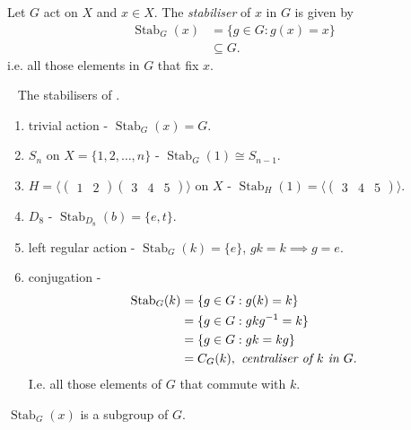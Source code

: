 \begin{definition}[Stabiliser] \label{def:19}
    Let $G$ act on $X$ and $x \in X$.
    The \emph{stabiliser} of $x$ in $G$ is given by
    \begin{align*}
        \operatorname{Stab}_G(x) &= \{ g \in G : g(x) = x \} \\
        &\subseteq G.
    \end{align*} 
    i.e. all those elements in $G$ that fix $x$.
\end{definition} 

\begin{example} ~
    The stabilisers of .
    \begin{enumerate}
        \item trivial action - $\operatorname{Stab}_G(x) = G$.
        \item $S_n$ on $X = \{1, 2, \dots, n\}$ - $\operatorname{Stab}_G(1) \cong S_{n-1}$.
        \item $H = \langle \begin{pmatrix}1 & 2\end{pmatrix} \begin{pmatrix}3 & 4 & 5\end{pmatrix} \rangle$ on $X$ - $\operatorname{Stab}_H(1) = \langle \begin{pmatrix}3 & 4 & 5\end{pmatrix} \rangle$.
        \item $D_8$ - $\operatorname{Stab}_{D_8}(b) = \{e, t\}$. \\
        \item left regular action - $\operatorname{Stab}_G(k) = \{e\}$, $gk = k \implies g = e$.
        \item conjugation - \begin{align*}
            \operatorname{Stab}_G(k) &= \{g \in G : g(k) = k\} \\
            &= \{g \in G : g k g^{-1} = k\} \\
            &= \{g \in G : g k = kg \} \\
            &= C_G(k), \emph{ centraliser of $k$ in $G$}.
        \end{align*} I.e. all those elements of $G$ that commute with $k$.
    \end{enumerate} 
\end{example} 

\begin{lemma} \label{lem:18}
    $\operatorname{Stab}_G(x)$ is a subgroup of $G$.
\end{lemma} 

